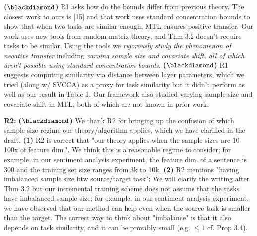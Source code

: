 \documentclass{article}
\begin{document}
\vspace{-0.045in}
\textbf{($\blackdiamond$)} R1 asks how do the bounds differ from previous theory. The closest work to ours is [15] and that work uses standard concentration bounds to show that when two tasks are similar enough, MTL ensures positive transfer.
Our work uses new tools from random matrix theory, and Thm 3.2 doesn't require tasks to be similar.
Using the tools we \textit{rigorously study the phenomenon of negative transfer} including \textit{varying sample size and covariate shift, all of which aren't possible using standard concentration bounds}.
\textbf{($\blackdiamond$)} R1 suggests computing similarity via distance between layer parameters,
which we tried (along w/ SVCCA) as a proxy for task similarity but it didn't perform as well as our result in Table 1. Our framework also studied varying sample size and covariate shift in MTL, both of which are not known in prior work.
%

\vspace{-0.025in}
\textbf{R2:}
\textbf{($\blackdiamond$)} We thank R2 for bringing up the confusion of which sample size regime our theory/algorithm applies, which we have clarified in the draft.
\textbf{(1)} R2 is correct that "our theory applies when the sample sizes are 10-100x of feature dim.".
We think this is a reasonable regime to consider; for example, in our sentiment analysis experiment, the feature dim. of a sentence is 300 and the training set size ranges from 3k to 10k.
\textbf{(2)} R2 mentions "having imbalanced sample size btw source/target task": We will clarify the writing after Thm 3.2 but our incremental training scheme does not assume that the tasks have imbalanced sample size; for example, in our sentiment analysis experiment, we have observed that our method can help even when the source task is smaller than the target.
The correct way to think about "imbalance" is that it also depends on task similarity, and it can be provably small (e.g. $\le 1$ cf. Prop 3.4).
\end{document}
